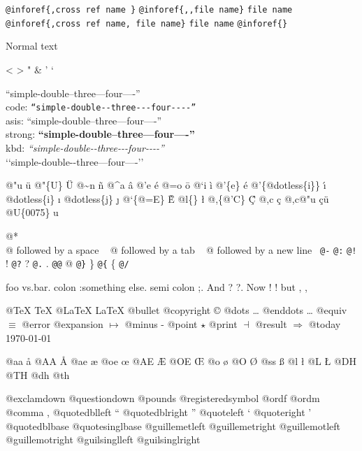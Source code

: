 \documentclass{book}
\begin{document}
\texttt{@inforef\{,cross ref name \}} 
\texttt{@inforef\{,,file name\}} \texttt{file name}
\texttt{@inforef\{,cross ref name, file name\}} \texttt{file name}
\texttt{@inforef\{\}} 



Normal text

<
>
"
\&
'
`

``simple-double--three---four----''\leavevmode{}\\
code: \texttt{``simple-double{-}{-}three{-}{-}{-}four{-}{-}{-}-''} \leavevmode{}\\
asis: ``simple-double--three---four----'' \leavevmode{}\\
strong: \textbf{``simple-double--three---four----''} \leavevmode{}\\
kbd: {\ttfamily\textsl{``simple-double{-}{-}three{-}{-}{-}four{-}{-}{-}-''}} \leavevmode{}\\

`\hbox{}`simple-double-\hbox{}-three---four----'\hbox{}'\leavevmode{}\\

%
%
%
%

@"u \"{u} 
@"\{U\} \"{U} 
@\~{}n \~{n}
@\^{}a \^{a}
@'e \'{e}
@=o \={o}
@`i \`{i}
@'\{e\} \'{e}
@'\{@dotless\{i\}\} \'{\i{}} 
@dotless\{i\} \i{}
@dotless\{j\} \j{}
@`\{@=E\} \`{\={E}} 
@l\{\} \l{}
@,\{@'C\} \c{\'{C}}
@,c \c{c}
@,c@"u \c{c}\"{u} \leavevmode{}\\

@U\{0075\} u

@* \leavevmode{}\\
@ followed by a space
\ {}
@ followed by a tab
\ {}
@ followed by a new line
\ {}\texttt{@-} \-{}
\texttt{@:} \@
\texttt{@!} \@!
\texttt{@?} \@?
\texttt{@.} \@.
\texttt{@@} @
\texttt{@\}} \}
\texttt{@\{} \{
\texttt{@/} 

foo vs.\@ bar. 
colon :\@And something else.
semi colon ;\@.
And ? ?\@.
Now ! !\@@
but , ,\@

@TeX \TeX{}
@LaTeX \LaTeX{}
@bullet \textbullet{}
@copyright \copyright{}
@dots \dots{}\@
@enddots \dots{}
@equiv $\equiv{}$
@error 
@expansion $\mapsto{}$
@minus -
@point $\star{}$
@print $\dashv{}$
@result $\Rightarrow{}$
@today \today{}

@aa \aa{}
@AA \AA{}
@ae \ae{}
@oe \oe{}
@AE \AE{}
@OE \OE{}
@o \o{}
@O \O{}
@ss \ss{}
@l \l{}
@L \L{}
@DH \DH{}
@TH \TH{}
@dh \dh{}
@th \th{}

@exclamdown \textexclamdown{}
@questiondown \textquestiondown{}
@pounds \textsterling{}
@registeredsymbol \circledR{}
@ordf \textordfeminine{}
@ordm \textordmasculine{}
@comma ,
@quotedblleft \textquotedblleft{}
@quotedblright \textquotedblright{}
@quoteleft \textquoteleft{}
@quoteright \textquoteright{}
@quotedblbase \quotedblbase{}
@quotesinglbase \quotesinglbase{}
@guillemetleft \guillemotleft{}
@guillemetright \guillemotright{}
@guillemotleft \guillemotleft{}
@guillemotright \guillemotright{}
@guilsinglleft \guilsinglleft{}
@guilsinglright \guilsinglright{}
\end{document}
